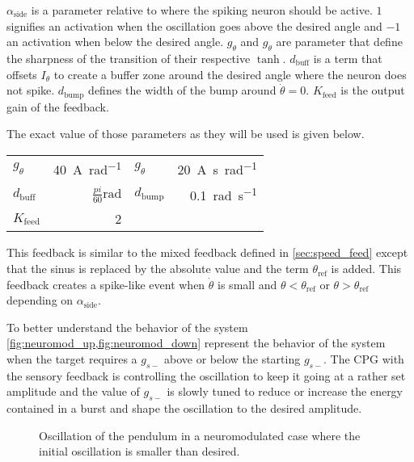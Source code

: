 $\alpha_\text{side}$ is a parameter relative to where the spiking neuron should be active.
$1$ signifies an activation when the oscillation goes above the desired angle and $-1$ an activation when below the desired angle.
$g_\theta$ and $g_{\dot{\theta}}$ are parameter that define the sharpness of the transition of their respective $\tanh$.
$d_\text{buff}$ is a term that offsets $I_\theta$ to create a buffer zone around the desired angle where the neuron does not spike.
$d_\text{bump}$ defines the width of the bump around $\dot{\theta} = 0$. 
$K_\text{feed}$ is the output gain of the feedback.

The exact value of those parameters as they will be used is given below.
{

\large\centering
\begin{tabular}{lr|lr}
    $g_\theta$      & \qty{40}{\ampere\per\radian}   & $g_{\dot{\theta}}$    & \qty{20}{\ampere\second\per\radian}\\
    $d_\text{buff}$ & $\frac{pi}{60}\unit{\radian}$  & $d_\text{bump}$       & \qty{0.1}{\radian\per\second}\\
    $K_\text{feed}$ & \num{2}                        &                       & 
\end{tabular}

}

This feedback is similar to the mixed feedback defined in \cref{sec:speed_feed} except that the sinus is replaced by the absolute value and the term $\theta_\text{ref}$ is added. 
This feedback creates a spike-like event when $\dot{\theta}$ is small and $\theta < \theta_\text{ref}$ or $\theta > \theta_\text{ref}$ depending on $\alpha_\text{side}$.

To better understand the behavior of the system \cref{fig:neuromod_up,fig:neuromod_down} represent the behavior of the system when the target requires a $g_{s-}$ above or below the starting $g_{s-}$.
The CPG with the sensory feedback is controlling the oscillation to keep it going at a rather set amplitude and the value of $g_{s-}$ is slowly tuned to reduce or increase the energy contained in a burst and shape the oscillation to the desired amplitude.

\begin{figure}[!htbp]
    \centering
    \caption{Oscillation of the pendulum in a neuromodulated case where the initial oscillation is smaller than desired.}
    \label{fig:neuromod_up}
\end{figure}

